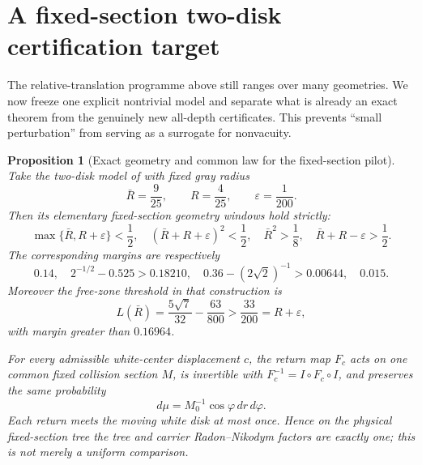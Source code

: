\documentclass[11pt]{article}
\newtheorem{proposition}[theorem]{Proposition}
\begin{document}
\section{A fixed-section two-disk certification target}

The relative-translation programme above still ranges over many geometries.
We now freeze one explicit nontrivial model and separate what is already an
exact theorem from the genuinely new all-depth certificates.  This prevents
``small perturbation'' from serving as a surrogate for nonvacuity.

\begin{proposition}[Exact geometry and common law for the fixed-section pilot]
\label{prop:fixed-section-exact-geometry}
Take the two-disk model of \cite{StenlundRandom} with fixed gray radius
\begin{equation}
 \bar R=\frac9{25},\qquad R=\frac4{25},\qquad
 \varepsilon=\frac1{200}.
\label{eq:fixed-section-rational-data}
\end{equation}
Then its elementary fixed-section geometry windows hold strictly:
\begin{equation}
\label{eq:fixed-section-geometry-windows}
 \max\{\bar R,R+\varepsilon\}<\frac12,
 \quad (\bar R+R+\varepsilon)^2<\frac12,
 \quad \bar R^2>\frac18,
 \quad \bar R+R-\varepsilon>\frac12.
\end{equation}
The corresponding margins are respectively
\begin{equation}
\label{eq:fixed-section-geometry-margins}
 0.14,\quad
 2^{-1/2}-0.525>0.18210,\quad
 0.36-(2\sqrt2)^{-1}>0.00644,\quad
 0.015.
\end{equation}
Moreover the free-zone threshold in that construction is
\begin{equation}
 L(\bar R)=\frac{5\sqrt7}{32}-\frac{63}{800}>\frac{33}{200}
 =R+\varepsilon,
\label{eq:fixed-section-free-zone}
\end{equation}
with margin greater than $0.16964$.

For every admissible white-center displacement $c$, the return map $F_c$
acts on one common fixed collision section $M$, is invertible with
$F_c^{-1}=I\circ F_c\circ I$, and preserves the same probability
\begin{equation}
 d\mu=M_0^{-1}\cos\varphi\,dr\,d\varphi.
\label{eq:fixed-section-common-law}
\end{equation}
Each return meets the moving white disk at most once.  Hence on the physical
fixed-section tree the tree and carrier Radon--Nikodym factors are exactly
one; this is not merely a uniform comparison.
\end{proposition}
\end{document}

